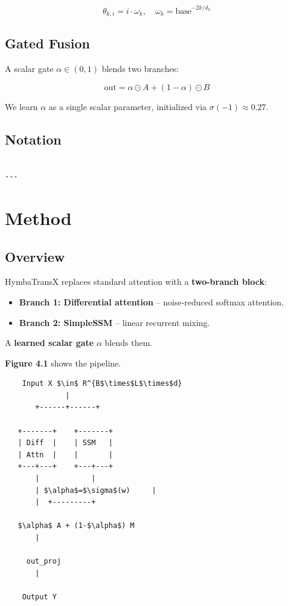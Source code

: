 \[
\theta_{k, i} = i \cdot \omega_k, \quad
\omega_k = \text{base}^{-2k / d_h}
\tag{3.7}
\]

\subsection{Gated Fusion}

A scalar gate $\alpha \in (0, 1)$ blends two branches:

\[
\text{out} = \alpha \odot A + (1 - \alpha) \odot B
\tag{3.8}
\]

We learn $\alpha$ as a single scalar parameter, initialized via 
$\sigma(-1) \approx 0.27$.

\subsection{Notation}

\begin{lstlisting}

---
\end{lstlisting}

\section{Method}

\subsection{Overview}

HymbaTransX replaces standard attention with a \textbf{two-branch block}:

\begin{itemize}
\item \textbf{Branch 1: Differential attention} -- noise-reduced softmax attention.
\item \textbf{Branch 2: SimpleSSM} -- linear recurrent mixing.

\end{itemize}
A \textbf{learned scalar gate} $\alpha$ blends them.

\textbf{Figure 4.1} shows the pipeline.

\begin{lstlisting}
    Input X $\in$ R^{B$\times$L$\times$d}
              |
       +------+------+
                      
   +-------+    +-------+
   | Diff  |    | SSM   |
   | Attn  |    |       |
   +---+---+    +---+---+
       |            |
       | $\alpha$=$\sigma$(w)     |
       |  +---------+
           
   $\alpha$ A + (1-$\alpha$) M
       |
        
     out_proj
       |
        
    Output Y
\end{lstlisting}

